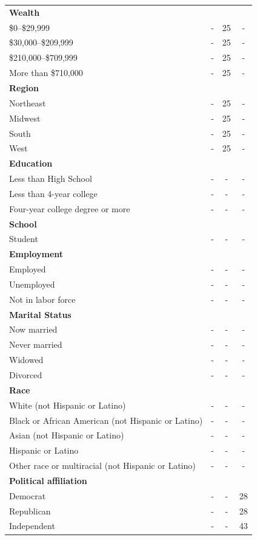 \documentclass[11pt]{article}
\begin{document}
\begin{ThreePartTable}
\begin{longtable}{lccc}
\textbf{Wealth} \\
\$0--\$29{,}999            & - & 25 & -\\
\$30{,}000--\$209{,}999    & - & 25 & -\\
\$210{,}000--\$709{,}999   & - & 25 & -\\
More than \$710{,}000     & - & 25 &  -\\[0.5em]

\textbf{Region} \\
Northeast   & - & 25 & -\\
Midwest     & - & 25 & -\\
South       & - & 25 & -\\
West       & - & 25 &  -\\[0.5em]

\textbf{Education} \\
Less than High School         & - & - &  -\\
Less than 4-year college           & - & - &  -\\
Four-year college degree or more     & - & - &  -\\[0.5em]                

\textbf{School} \\
Student                   & - & - & -\\[0.5em]

\textbf{Employment} \\
Employed                     & - & - & -\\
Unemployed                   & - & - & -\\
Not in labor force           & - & - & -\\[0.5em]

\textbf{Marital Status} \\
Now married                     & - & - & -\\
Never married                   & - & - & -\\
Widowed                         & - & - & -\\
Divorced                        & - & - & -\\[0.5em]

\textbf{Race} \\
White (not Hispanic or Latino)                      & - & - & -\\
Black or African American (not Hispanic or Latino)  & - & - & -\\
Asian (not Hispanic or Latino)                      & - & - & -\\
Hispanic or Latino                                  & - & - & -\\
Other race or multiracial (not Hispanic or Latino)  & - & - & -\\[0.5em]

\textbf{Political affiliation} \\
Democrat        & - & - & 28 \\
Republican      & - & - & 28 \\
Independent     & - & - & 43 \\

\end{longtable}
\end{ThreePartTable}

\FloatBarrier
\end{document}
